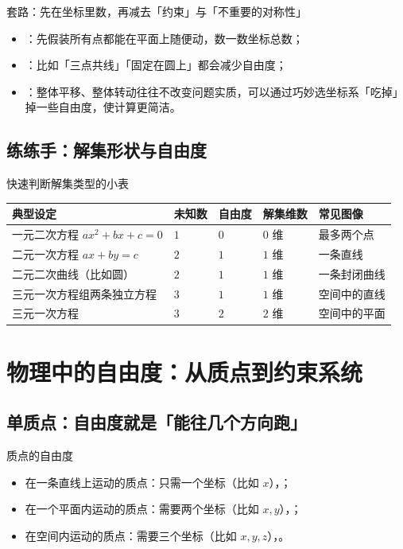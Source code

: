 \documentclass[a4paper,11pt]{ctexart}
\begin{document}
\begin{notebox}{套路：先在坐标里数，再减去「约束」与「不重要的对称性」}
  \begin{itemize}
    \item {}：先假装所有点都能在平面上随便动，数一数坐标总数；
    \item {}：比如「三点共线」「固定在圆上」都会减少自由度；
    \item {}：整体平移、整体转动往往不改变问题实质，可以通过巧妙选坐标系「吃掉」掉一些自由度，使计算更简洁。
  \end{itemize}
\end{notebox}

\subsection{练练手：解集形状与自由度}

\begin{summarybox}{快速判断解集类型的小表}
  \renewcommand{\arraystretch}{1.3}
  \begin{tabularx}{0.98\textwidth}{l>{\centering\arraybackslash}p{1.7cm}>{\centering\arraybackslash}p{1.7cm}>{\centering\arraybackslash}p{1.8cm}X}
    \toprule
    典型设定 & 未知数 & 自由度 & 解集维数 & 常见图像 \\
    \midrule
    一元二次方程 $ax^2+bx+c=0$ & $1$ & $0$ & $0$ 维 & 最多两个点 \\
    二元一次方程 $ax+by=c$ & $2$ & $1$ & $1$ 维 & 一条直线 \\
    二元二次曲线（比如圆） & $2$ & $1$ & $1$ 维 & 一条封闭曲线 \\
    三元一次方程组两条独立方程 & $3$ & $1$ & $1$ 维 & 空间中的直线 \\
    三元一次方程 & $3$ & $2$ & $2$ 维 & 空间中的平面 \\
    \bottomrule
  \end{tabularx}
\end{summarybox}

\clearpage
\section{物理中的自由度：从质点到约束系统}

\subsection{单质点：自由度就是「能往几个方向跑」}

\begin{definitionbox}{质点的自由度}
  \begin{itemize}
    \item 在一条直线上运动的质点：只需一个坐标（比如 $x$），；
    \item 在一个平面内运动的质点：需要两个坐标（比如 $x,y$），；
    \item 在空间内运动的质点：需要三个坐标（比如 $x,y,z$），。
  \end{itemize}
\end{definitionbox}
\end{document}
